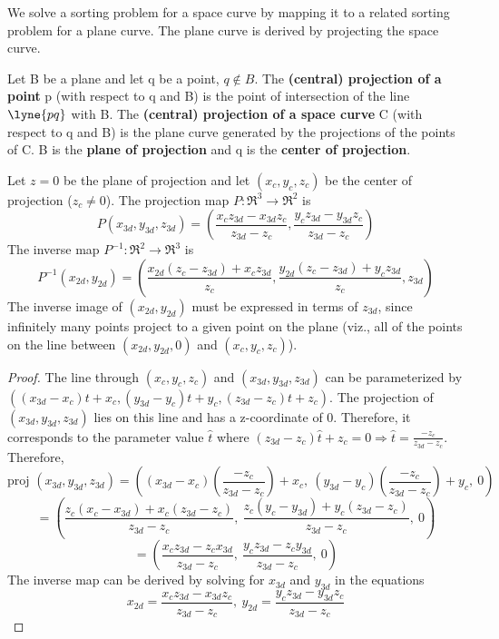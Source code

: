 We solve a sorting problem for a space curve by mapping it to a related
sorting problem for a plane curve.
The plane curve is derived by projecting the space curve.
%
\begin{definition}
Let B be a plane and let q be a point, $q \notin B$.
The {\bf (central) projection of a point} p (with respect to q and B)
is the point of intersection of the line $\lyne{pq}$ with B.
The {\bf (central) projection of a space curve} C (with respect to q 
and B) is the plane curve generated by the projections of the points of C.
B is the {\bf plane of projection} and q is the 
{\bf center of projection}.
\end{definition}
%
\begin{lemma}
\label{lem-sec5-project}
Let $z=0$ be the plane of projection and let $(x_{c},y_{c},z_{c})$
be the center of projection ($z_{c} \neq 0$).
The projection map $P:\Re^{3} \rightarrow \Re^{2}$ is 
\[ P(x_{3d}, y_{3d},z_{3d}) = (\frac{x_{c}z_{3d} - x_{3d}z_{c}}{z_{3d}-z_{c}},
                             \frac{y_{c}z_{3d} - y_{3d}z_{c}}{z_{3d}-z_{c}})\]
The inverse map $P^{-1}:\Re^{2} \rightarrow \Re^{3}$ is 
\[P^{-1}(x_{2d},y_{2d})=(\frac{x_{2d}(z_{c}-z_{3d})+x_{c}z_{3d}}{z_{c}},
                              \frac{y_{2d}(z_{c}-z_{3d})+y_{c}z_{3d}}{z_{c}},
                              z_{3d}) \]
The inverse image of $(x_{2d},y_{2d})$ must be expressed
in terms of $z_{3d}$, since infinitely many points project to a given
point on the plane (viz., all of the points on the line between 
$(x_{2d},y_{2d},0)$ and $(x_{c},y_{c},z_{c})$).
\end{lemma}
%
\begin{proof}
The line through $(x_{c},y_{c},z_{c})$ and $(x_{3d},y_{3d},z_{3d})$ 
can be parameterized by 
$((x_{3d}-x_{c})t + x_{c},(y_{3d}-y_{c})t+y_{c},(z_{3d}-z_{c})t+z_{c})$.
The projection of $(x_{3d},y_{3d},z_{3d})$ lies on this line 
and has a z-coordinate of 0.  
Therefore, it corresponds to the parameter value $\hat{t}$
where $(z_{3d}-z_{c})\hat{t} + z_{c} = 0 \Rightarrow \hat{t} = 
\frac{-z_{c}}{z_{3d}-z_{c}}$.
Therefore, 
\[ \mbox{proj }(x_{3d},y_{3d},z_{3d}) 
= ((x_{3d}-x_{c})(\frac{-z_{c}}{z_{3d}-z_{c}}) + x_{c},\ 
   (y_{3d}-y_{c})(\frac{-z_{c}}{z_{3d}-z_{c}}) + y_{c},\ 0) \]
\[ = (\frac{z_{c}(x_{c}-x_{3d}) + x_{c}(z_{3d}-z_{c})}{z_{3d}-z_{c}},
\ \frac{z_{c}(y_{c}-y_{3d}) + y_{c}(z_{3d}-z_{c})}
   {z_{3d}-z_{c}},\ 0) \]
\[ = (\frac{x_{c} z_{3d} - z_{c} x_{3d}}{z_{3d}-z_{c}},
\ \frac{y_{c} z_{3d} - z_{c} y_{3d}}{z_{3d} - z_{c}},\ 0) \]
%
The inverse map can be derived by solving for $x_{3d}$ and $y_{3d}$
in the equations
\[ x_{2d} = \frac{x_{c}z_{3d} - x_{3d}z_{c}}{z_{3d}-z_{c}},
\ y_{2d} = \frac{y_{c}z_{3d} - y_{3d}z_{c}}{z_{3d}-z_{c}} \]
\end{proof}

